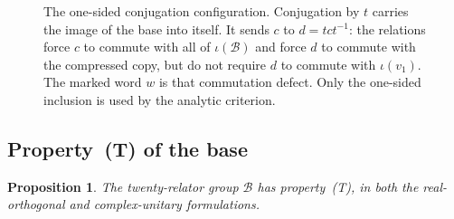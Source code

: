 \documentclass[11pt]{amsart}
\newcommand{\leanverified}[2]{\ignorespaces}
\newtheorem{proposition}[theorem]{Proposition}
\theoremstyle{definition}
\theoremstyle{remark}
\theoremstyle{plain}
\begin{document}
\begin{figure}[htbp]
%
\tagmcend\tagstructend
\caption{The one-sided conjugation configuration.  Conjugation by $t$ carries the
image of the base into itself.  It sends $c$ to $d=tct^{-1}$: the
relations force $c$ to commute with all of $\iota(\mathcal B)$ and force
$d$ to commute with the compressed copy, but do not require $d$ to commute
with $\iota(v_1)$.  The marked word $w$ is that commutation defect.
Only the one-sided inclusion is used by the analytic criterion.}
\label{fig:compression-pattern}
\end{figure}

\subsection{Property~\textup{(T)} of the base}

\begin{proposition}\label{prop:literal-base-T}
The twenty-relator group $\mathcal B$ has property~\textup{(T)}, in both
the real-orthogonal and complex-unitary formulations.
\leanverified{Sofic/LiteralBaseP13PropertyTBridge}{GroupApproximation.LiteralBaseP13PropertyTBridge.manuscriptBaseHasKazhdanPropertyT}
\end{proposition}
\end{document}
